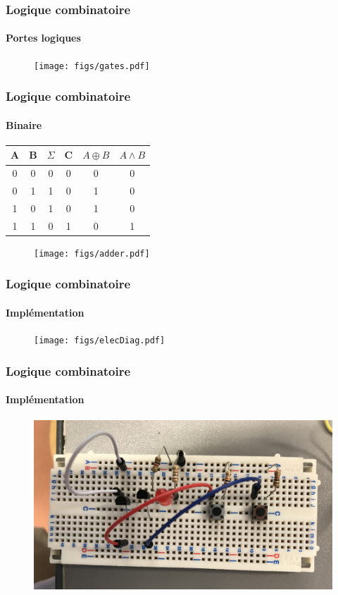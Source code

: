 \begin{frame}

  \frametitle{Logique combinatoire}
  \framesubtitle{Portes logiques}

  \begin{figure}

    \centering
    \texttt{[image: figs/gates.pdf]}
  \end{figure}

\end{frame}


\begin{frame}

  \frametitle{Logique combinatoire}
  \framesubtitle{Binaire}

  \begin{center}
    \begin{tabular}{ |c|c||c|c||c|c| }
     \hline
     A & B & $\Sigma$ & C & $A\oplus B$ & $A\land B$  \\
     \hline
     0 & 0 & 0 & 0 & 0 & 0\\
     \hline
     0 & 1 & 1 & 0 & 1 & 0\\
     \hline
     1 & 0 & 1 & 0 & 1 & 0\\
     \hline
     1 & 1 & 0 & 1 & 0 & 1\\
     \hline
    \end{tabular}
  \end{center}


  \begin{figure}

    \centering
    \texttt{[image: figs/adder.pdf]}
  \end{figure}


\end{frame}


\begin{frame}

  \frametitle{Logique combinatoire}
  \framesubtitle{Implémentation}

  \begin{figure}

    \centering
    \texttt{[image: figs/elecDiag.pdf]}

  \end{figure}


\end{frame}


\begin{frame}

  \frametitle{Logique combinatoire}
  \framesubtitle{Implémentation}



  \begin{figure}

    \centering
    \includegraphics[width=\linewidth]{pics/and.jpg}
  \end{figure}


\end{frame}
